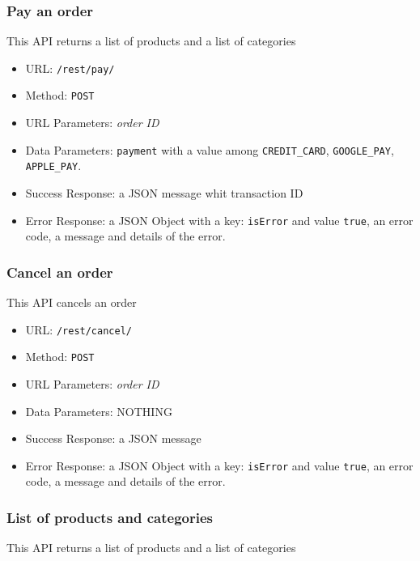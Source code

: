 \subsubsection*{Pay an order}

This API returns a list of products and a list of categories

\begin{itemize}
    \item URL: \texttt{/rest/pay/}
    \item Method: \texttt{POST}
    \item URL Parameters: \textit{order ID}
    \item Data Parameters: \texttt{payment} with a value among \texttt{CREDIT\_CARD}, \texttt{GOOGLE\_PAY}, \texttt{APPLE\_PAY}.
    \item Success Response: a JSON message whit transaction ID
    \item Error Response: a JSON Object with a key: \texttt{isError}  and value \texttt{true}, an error code, a message and details of the error.

\end{itemize}

\subsubsection*{Cancel an order}

This API cancels an order

\begin{itemize}
    \item URL: \texttt{/rest/cancel/}
    \item Method: \texttt{POST}
    \item URL Parameters: \textit{order ID}
    \item Data Parameters: NOTHING
    \item Success Response: a JSON message
    \item Error Response: a JSON Object with a key: \texttt{isError}  and value \texttt{true}, an error code, a message and details of the error.

\end{itemize}

\subsubsection*{List of products and categories}

This API returns a list of products and a list of categories

